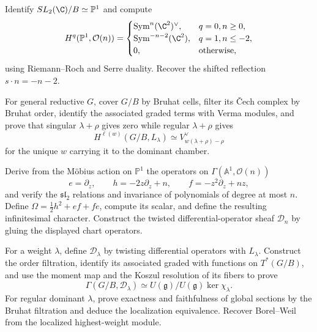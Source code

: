 \begin{exercise}
Identify $SL_2(\C)/B\simeq\mathbb P^1$ and compute
\[
 H^q(\mathbb P^1,\mathcal O(n))=
 \begin{cases}
  \operatorname{Sym}^n(\C^2)^\vee,&q=0, n\ge0,\\
  \operatorname{Sym}^{-n-2}(\C^2),&q=1, n\le-2,\\
  0,&\text{otherwise},
 \end{cases}
\]
using Riemann--Roch and Serre duality.  Recover the shifted reflection
$s\mathbin\cdot n=-n-2$.
\end{exercise}

\begin{exercise}
For general reductive $G$, cover $G/B$ by Bruhat
cells, filter its \v Cech complex by Bruhat order, identify the associated
graded terms with Verma modules, and prove that singular $\lambda+\rho$ gives
zero while regular $\lambda+\rho$ gives
\[
 H^{\ell(w)}(G/B,L_\lambda)
 \simeq V_{w(\lambda+\rho)-\rho}^\vee
\]
for the unique $w$ carrying it to the dominant chamber.
\end{exercise}

\begin{exercise}
Derive from the M\"obius action on $\mathbb P^1$ the operators on
$\Gamma(\mathbb A^1,\mathcal O(n))$
\[
 e=\partial_z,\qquad h=-2z\partial_z+n,\qquad
 f=-z^2\partial_z+nz,
\]
and verify the $\mathfrak{sl}_2$ relations and invariance of polynomials of
degree at most $n$.  Define
$\Omega=\tfrac12h^2+ef+fe$, compute its scalar, and define the resulting
infinitesimal character.  Construct the twisted differential-operator sheaf
$\mathcal D_n$ by gluing the displayed chart operators.
\end{exercise}

\begin{exercise}
For a weight $\lambda$, define $\mathcal D_\lambda$ by twisting differential
operators with $L_\lambda$.  Construct the order filtration, identify its
associated graded with functions
on $T^*(G/B)$, and use the moment map and the Koszul resolution of its fibers
to prove
\[
 \Gamma(G/B,\mathcal D_\lambda)
 \simeq U(\mathfrak g)/U(\mathfrak g)\ker\chi_\lambda.
\]
For regular dominant $\lambda$, prove exactness and faithfulness of global
sections by the Bruhat filtration and deduce the localization equivalence.
Recover Borel--Weil from the localized highest-weight module.
\end{exercise}


